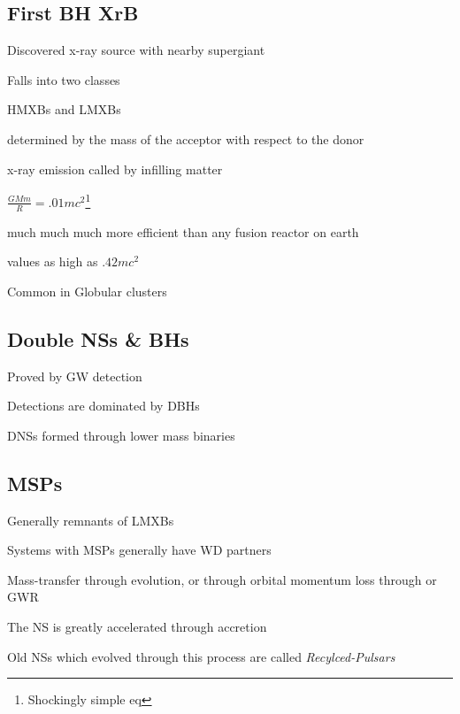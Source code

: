 \documentclass{article}
\begin{document}
\subsection{First BH XrB}
\begin{list}{-}{}
\item Discovered x-ray source with nearby supergiant
\item Falls into two classes
\item HMXBs and LMXBs
\item determined by the mass of the acceptor with respect to the donor
\item x-ray emission called by infilling matter
\item \(\frac{GMm}{R} = .01mc^2\)\footnote{Shockingly simple eq}
\item much much much more efficient than any fusion reactor on earth
\item values as high as \(.42mc^2\)
\item Common in Globular clusters
\end{list}

\subsection{Double NSs \& BHs}
\begin{list}{-}{}
\item Proved by GW detection
\item Detections are dominated by DBHs 
\item DNSs formed through lower mass binaries
\end{list}

\subsection{MSPs}
\begin{list}{-}{}
\item Generally remnants of LMXBs
\item Systems with \gls{MSP}s generally have WD partners
\item Mass-transfer through evolution, or through orbital momentum loss through or GWR
\item The NS is greatly accelerated through accretion
\item Old NSs which evolved through this process are called \textit{\gls{Recylced-Pulsar}s}
\end{list}
\end{document}
